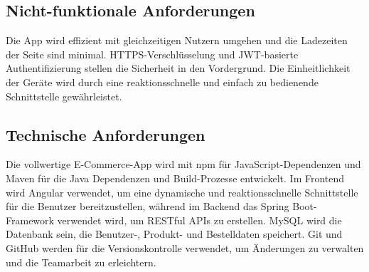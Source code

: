 \subsection{Nicht-funktionale Anforderungen}

Die App wird effizient mit gleichzeitigen Nutzern umgehen und die Ladezeiten der Seite sind minimal. HTTPS-Verschlüsselung und JWT-basierte Authentifizierung stellen die Sicherheit in den Vordergrund. Die Einheitlichkeit der Geräte wird durch eine reaktionsschnelle und einfach zu bedienende Schnittstelle gewährleistet.

\subsection{Technische  Anforderungen}

Die vollwertige E-Commerce-App wird mit npm für JavaScript-Dependenzen und Maven für die Java Dependenzen und Build-Prozesse entwickelt. Im Frontend wird Angular verwendet, um eine dynamische und reaktionsschnelle Schnittstelle für die Benutzer bereitzustellen, während im Backend das Spring Boot-Framework verwendet wird, um RESTful APIs zu erstellen. MySQL wird die Datenbank sein, die Benutzer-, Produkt- und Bestelldaten speichert. Git und GitHub werden für die Versionskontrolle verwendet, um Änderungen zu verwalten und die Teamarbeit zu erleichtern. 